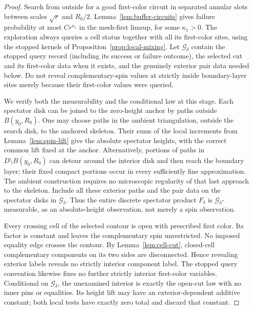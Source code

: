 \begin{proof}
Search from outside for a good first-color circuit in separated
annular slots between scales \(\sqrt r\) and \(R_0/2\).
Lemma~\ref{lem:buffer-circuits} gives failure probability at most
\(Cr^{\kappa_1}\) in the mesh-first limsup, for some
\(\kappa_1>0\).  The exploration always queries a cell status
together with all its first-color sites, using the stopped kernels
of Proposition~\ref{prop:local-mixing}.  Let
\(\mathcal G_\delta\) contain the stopped query record (including its
success or failure outcome), the selected cut and its first-color data
when it exists, and the genuinely exterior pair data needed below.
Do not reveal complementary-spin values at strictly
inside boundary-layer sites merely because their first-color values
were queried.

We verify both the measurability and the conditional law at this
stage.  Each spectator disk can be joined to the zero-height anchor
by paths outside \(B(y_0,R_0)\).  One may choose paths in the ambient
triangulation, outside the search disk, to the anchored skeleton.
Their sums of the local increments from Lemma~\ref{lem:spin-lift}
give the absolute spectator heights, with the correct common lift
fixed at the anchor.  Alternatively, portions of paths in
\(D\setminus\overline{B(y_0,R_0)}\) can detour around the interior
disk and then reach the boundary layer; their fixed compact
portions occur in every sufficiently fine approximation.
The ambient construction requires no microscopic regularity of that
last approach to the skeleton.  Include all these exterior paths
and the pair data on the spectator disks in \(\mathcal G_\delta\).
Thus the entire discrete spectator product \(F_\delta\) is
\(\mathcal G_\delta\)-measurable, as an absolute-height observation,
not merely a spin observation.

Every crossing cell of the selected contour is open with prescribed
first color.  Its factor is constant and leaves the complementary
spin unrestricted.  No imposed equality edge crosses the contour.
By Lemma~\ref{lem:cell-cut}, closed-cell complementary components
on its two sides are disconnected.  Hence revealing exterior labels
reveals no strictly interior component label.
The stopped query convention likewise fixes no further strictly
interior first-color variables.  Conditional on
\(\mathcal G_\delta\), the unexamined interior is exactly the
open-cut law with no inner pins or equalities.
Its height lift may have an exterior-dependent additive constant;
both local tests have exactly zero total and discard that constant.


\end{proof}
